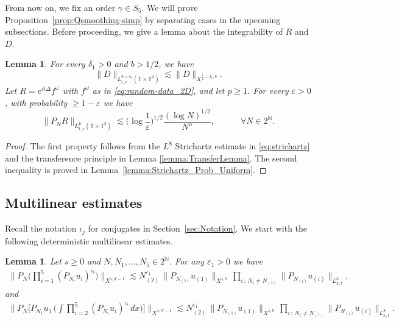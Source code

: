 \documentclass[11pt, xcolor = dvipsnames,reqno
]{amsart}
\newtheorem{lem}[thm]{Lemma}
\theoremstyle{definition}
\theoremstyle{remark}
\begin{document}
From now on, we fix an order $\gamma \in S_5$. We will prove Proposition~\ref{prop:Qsmoothing-simp} by separating cases in the upcoming subsections. 
%
Before proceeding, we give a lemma about the integrability of $R$ and $D$.
\begin{lem}\label{lemma:L8bound}
For every $\delta_1 > 0$ and $b > 1/2$,  we have 
\begin{equation}\label{eq:L8bound-1}
    \|
     D 
    \|_{L^{8 + \delta_1}_{t,x}(\mathbb{T} \times \mathbb{T}^2)}
    \lesssim 
    \|
     D 
    \|_{X^{\frac12 + \delta_1, b}}.
\end{equation}
Let $R = e^{it\Delta} f^\omega$ with $f^\omega$ as in \eqref{eq:random-data_2D}, and let $p \geq 1$. For every $\varepsilon > 0$, with probability $\geq 1 - \varepsilon$ we have 
\begin{equation}\label{eq:Lp_bound-Prob}
        \lVert  P_{N}R \rVert_{L_{t,x}^p(\mathbb{T} \times \mathbb{T}^2)}
        \lesssim \Big( \log \frac{1}{\varepsilon} \Big)^{1/2} \frac{(\log N )^{1/2}}{N^{\alpha}}, 
        \qquad \quad \forall N \in 2^{\mathbb N}.
    \end{equation}
\end{lem}
\begin{proof}
The first property follows from the $L^8$ Strichartz estimate in \eqref{eq:strichartz} and the transference principle in Lemma \ref{lemma:TransferLemma}.
The second inequality is proved in Lemma~\ref{lemma:Strichartz_Prob_Uniform}. 
\end{proof}




\subsection{Multilinear estimates} \label{subsec:multi-est} 

Recall the notation $\iota_j$ for conjugates in Section~\ref{sec:Notation}. 
We start with the following deterministic multilinear estimates.

\begin{lem}\label{lemma:Multilinear_Estimates}
Let $s \geq 0$
and $N, N_1, \ldots, N_5 \in 2^{\mathbb{N}}$. For any $\varepsilon_1 > 0$ we have
\begin{align}\label{eq:Multilineal_Main}
    \bigg\lVert P_N \Big( \prod_{i=1}^5 (P_{N_i} u_i)^{\iota_i} \Big) 
    \bigg\rVert_{X^{s, b'-1}} 
    \lesssim 
    N_{(2)}^{\varepsilon_1} \, 
    \lVert P_{N_{(1)}} u_{(1)} \rVert_{X^{s,b}} \, 
    \prod_{i \, : \, N_i \neq N_{(1)}}
    \lVert P_{N_{(i)}} u_{(i)} \rVert_{L^8_{x,t}}, 
    \end{align}
and     \begin{align}\label{eq:Multilineal_Secondary}
    \bigg\lVert P_N \bigg[ 
    P_{N_1} u_1 \, 
    \bigg(\int \prod_{i=2}^5 (P_{N_i} u_i)^{\iota_i}  \, dx 
    \bigg)
    \bigg] 
    \bigg\rVert_{X^{s, b'-1}} 
    \lesssim 
    N_{(2)}^{\varepsilon_1} \, 
    \lVert P_{N_{(1)}} u_{(1)} \rVert_{X^{s,b}} \, 
    \prod_{i \, : \, N_i \neq N_{(1)}} \lVert P_{N_{(i)}} u_{(i)} \rVert_{L^8_{x,t}}.
    \end{align}
\end{lem}
\end{document}

